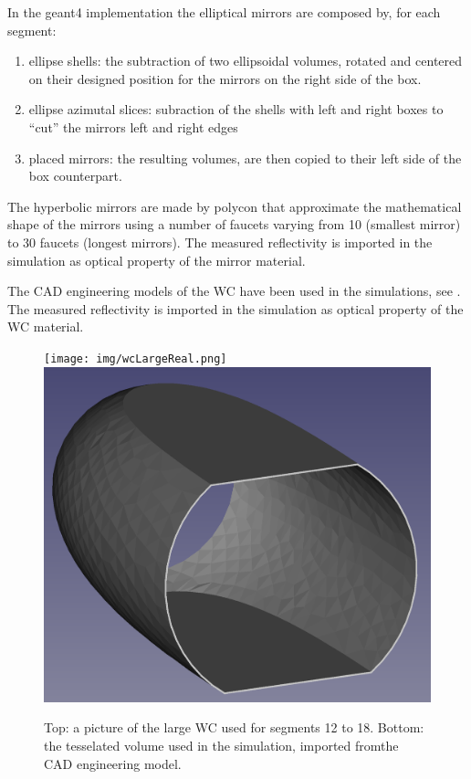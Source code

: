 In the geant4 implementation the elliptical mirrors are composed by, for each segment:

\begin{enumerate}
	\item ellipse shells: the subtraction of two ellipsoidal volumes, rotated and centered on their designed position for the mirrors on the right side of the box.
	\item ellipse azimutal slices: subraction of the shells with left and right boxes to ``cut'' the mirrors left and right edges
	\item placed mirrors: the resulting volumes,  are then copied to their left side of the box counterpart.
\end{enumerate}

The hyperbolic mirrors are made by polycon that approximate the mathematical shape of the mirrors using a number of faucets
varying from 10 (smallest mirror) to 30 faucets (longest mirrors). The measured reflectivity is imported in the simulation as
optical property of the mirror material.


The CAD engineering models of the WC have been used in the simulations, see . The measured reflectivity is imported in the simulation as
optical property of the WC material.

\begin{figure}
	\centering
	\texttt{[image: img/wcLargeReal.png]}
	\includegraphics[width=0.95\columnwidth,keepaspectratio]{img/wcLargeSim.png}
	\caption{Top: a picture of the large WC used for segments 12 to 18. Bottom: the tesselated volume used in the
            simulation, imported fromthe CAD engineering model.}
	\label{fig:wcSimulation}
\end{figure}


